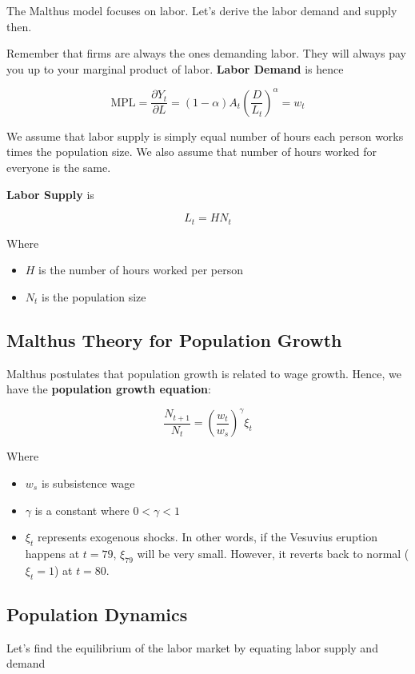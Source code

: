 \documentclass[11pt]{scrartcl}
\begin{document}
The Malthus model focuses on labor. Let's derive the labor demand and supply then.

Remember that firms are always the ones demanding labor. They will always pay you up to your marginal product of labor. \textbf{Labor Demand} is hence

\[\mathrm{MPL} = \frac{\partial Y_t}{\partial L} = (1-\alpha)A_t\left(\frac{D}{L_t}\right)^\alpha = w_t\]

We assume that labor supply is simply equal number of hours each person works times the population size. We also assume that number of hours worked for everyone is the same. 

\textbf{Labor Supply} is 

\[L_t = HN_t\]

Where

\begin{itemize}
\item $H$ is the number of hours worked per person
\item $N_t$ is the population size
\end{itemize}

\subsection{Malthus Theory for Population Growth}

Malthus postulates that population growth is related to wage growth. Hence, we have the \textbf{population growth equation}:

\[ \frac{N_{t+1}}{N_t} = \left(\frac{w_t}{w_s}\right)^\gamma \xi_t \]

Where

\begin{itemize}
\item $w_s$ is subsistence wage
\item $\gamma$ is a constant where $0 < \gamma < 1$
\item $\xi_t$ represents exogenous shocks. In other words, if the Vesuvius eruption happens at $t=79$, $\xi_{79}$ will be very small. However, it reverts back to normal ($\xi_t = 1$) at $t=80$. 
\end{itemize}

\subsection{Population Dynamics}

Let's find the equilibrium of the labor market by equating labor supply and demand
\end{document}
